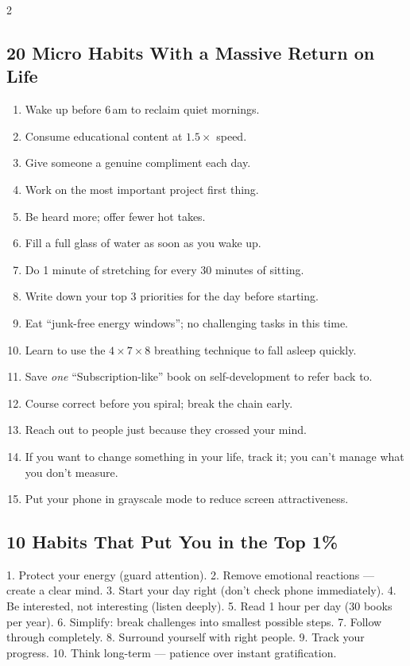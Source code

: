 \documentclass[10pt,a4paper]{article}
\begin{document}
\begin{multicols}{2}
\subsection{20 Micro Habits With a Massive Return on Life}
\begin{enumerate}
\item Wake up before 6\,am to reclaim quiet mornings.
\item Consume educational content at $1.5\times$ speed.
\item Give someone a genuine compliment each day.
\item Work on the most important project first thing.
\item Be heard more; offer fewer hot takes.
\item Fill a full glass of water as soon as you wake up.
\item Do 1 minute of stretching for every 30 minutes of sitting.
\item Write down your top 3 priorities for the day before starting.
\item Eat ``junk-free energy windows''; no challenging tasks in this time.
\item Learn to use the $4\times7\times8$ breathing technique to fall asleep quickly.
\item Save \emph{one} ``Subscription-like'' book on self-development to refer back to.
\item Course correct before you spiral; break the chain early.
\item Reach out to people just because they crossed your mind.
\item If you want to change something in your life, track it; you can't manage what you don't measure.
\item Put your phone in grayscale mode to reduce screen attractiveness.
\end{enumerate}

\subsection{10 Habits That Put You in the Top 1\%}
1. Protect your energy (guard attention).
2. Remove emotional reactions --- create a clear mind.
3. Start your day right (don't check phone immediately).
4. Be interested, not interesting (listen deeply).
5. Read 1 hour per day (30 books per year).
6. Simplify: break challenges into smallest possible steps.
7. Follow through completely.
8. Surround yourself with right people.
9. Track your progress.
10. Think long-term --- patience over instant gratification.


\end{multicols}
\end{document}
